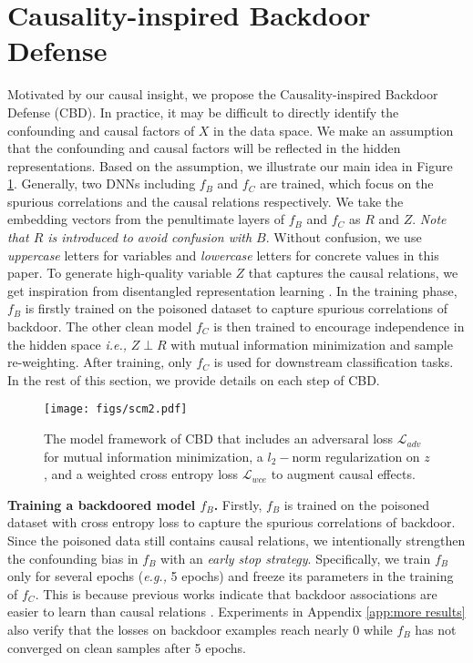 \section{Causality-inspired Backdoor Defense}
Motivated by our causal insight, we propose the Causality-inspired Backdoor Defense (CBD). 
In practice, it may be difficult to directly identify the confounding and causal factors of $X$ in the data space. We make an assumption that the confounding and causal factors will be reflected in the hidden representations. 
Based on the assumption, we illustrate our main idea in Figure \ref{scm2}.
Generally, two DNNs including $f_B$ and $f_C$ are trained, which focus on the spurious correlations and the causal relations respectively. We take the embedding vectors from the penultimate layers of $f_B$ and $f_C$ as $R$ and $Z$. 
\emph{Note that $R$ is introduced to avoid confusion with $B$}.
Without confusion, we use \emph{uppercase} letters for variables and \emph{lowercase} letters for concrete values in this paper. To generate high-quality variable $Z$ that captures the causal relations, we get inspiration from disentangled representation learning \cite{wang2020cross, hamaguchi2019rare}.
In the training phase, $f_B$ is firstly trained on the poisoned dataset to capture spurious correlations of backdoor. The other clean model $f_C$ is then trained to encourage independence in the hidden space \emph{i.e.,} $Z \perp R$ with mutual information minimization and sample re-weighting. After training, only $f_C$ is used for downstream classification tasks. In the rest of this section, we provide details on each step of CBD. 
\begin{figure}[t]
    \centering
    \texttt{[image: figs/scm2.pdf]}
    \caption{The model framework of CBD that includes an adversaral loss $\mathcal{L}_{adv}$ for mutual information minimization, a $l_2-$norm regularization on $z$, and a weighted cross entropy loss $\mathcal{L}_{wce}$ to augment causal effects.}
    \label{scm2}
    \vspace{-1em}
\end{figure}

\noindent\textbf{Training a backdoored model $f_B$. }Firstly, $f_B$ is trained on the poisoned dataset with cross entropy loss to capture the spurious correlations of backdoor. Since the poisoned data still contains causal relations, we intentionally strengthen the confounding bias in $f_B$ with an \emph{early stop strategy}. Specifically, we train $f_B$ only for several epochs (\emph{e.g.,} 5 epochs) and freeze its parameters in the training of $f_C$. This is because previous works indicate that backdoor associations are easier to learn than causal relations \cite{li2021anti}. 
Experiments in Appendix \ref{app:more results} also verify that the losses on backdoor examples reach nearly 0 while $f_B$ has not converged on clean samples after 5 epochs.

